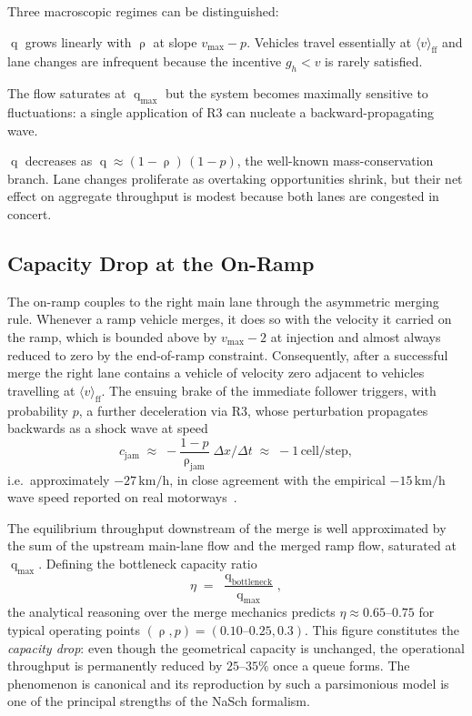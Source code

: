 \documentclass[11pt,a4paper]{article}
\DeclareMathOperator{\flow}{q}
\DeclareMathOperator{\dens}{\rho}
\begin{document}
Three macroscopic regimes can be distinguished:
\begin{description}[leftmargin=1.6em,style=nextline]
\item[Free flow ($\dens < \dens_c$).]
$\flow$ grows linearly with $\dens$ at slope
$v_{\max}-p$. Vehicles travel essentially at $\langle v\rangle_{\text{ff}}$
and lane changes are infrequent because the incentive
$g_h<v$ is rarely satisfied.
\item[Capacity plateau ($\dens \approx \dens_c$).]
The flow saturates at $\flow_{\max}$ but the system becomes maximally
sensitive to fluctuations: a single application of R3 can nucleate a
backward-propagating wave.
\item[Congested flow ($\dens > \dens_c$).]
$\flow$ decreases as $\flow \approx (1-\dens)\,(1-p)$, the well-known
mass-conservation branch. Lane changes proliferate as overtaking
opportunities shrink, but their net effect on aggregate throughput is
modest because both lanes are congested in concert.
\end{description}

\subsection{Capacity Drop at the On-Ramp}

The on-ramp couples to the right main lane through the asymmetric
merging rule. Whenever a ramp vehicle merges, it does so with the
velocity it carried on the ramp, which is bounded above by $v_{\max}-2$
at injection and almost always reduced to zero by the end-of-ramp
constraint. Consequently, after a successful merge the right lane
contains a vehicle of velocity zero adjacent to vehicles travelling at
$\langle v\rangle_{\text{ff}}$. The ensuing brake of the immediate
follower triggers, with probability $p$, a further deceleration via R3,
whose perturbation propagates backwards as a shock wave at speed
\begin{equation}
c_{\text{jam}} \;\approx\; -\frac{1-p}{\dens_{\text{jam}}}\;\Delta x/\Delta t
\;\approx\; -1\,\text{cell/step},
\end{equation}
i.e.\ approximately $-27\,\text{km/h}$, in close agreement with the
empirical $-15\,\text{km/h}$ wave speed reported on real
motorways~\cite{kerner2004}.

The equilibrium throughput downstream of the merge is well approximated
by the sum of the upstream main-lane flow and the merged ramp flow,
saturated at $\flow_{\max}$. Defining the bottleneck capacity ratio
\begin{equation}
\eta \;=\; \frac{\flow_{\text{bottleneck}}}{\flow_{\max}},
\end{equation}
the analytical reasoning over the merge mechanics predicts
$\eta \approx 0.65\text{--}0.75$ for typical operating points
$(\dens,p)=(0.10\text{--}0.25,0.3)$. This figure constitutes the
\emph{capacity drop}: even though the geometrical capacity is unchanged,
the operational throughput is permanently reduced by
$25\text{--}35\%$ once a queue forms. The phenomenon is canonical and
its reproduction by such a parsimonious model is one of the principal
strengths of the NaSch formalism.
\end{document}
